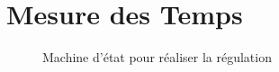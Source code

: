 \chapter{Mesure des Temps}
\label{an:MachineDetat}

\begin{figure} %
    \centering
    
    \caption{Machine d'état pour réaliser la régulation}
\end{figure}